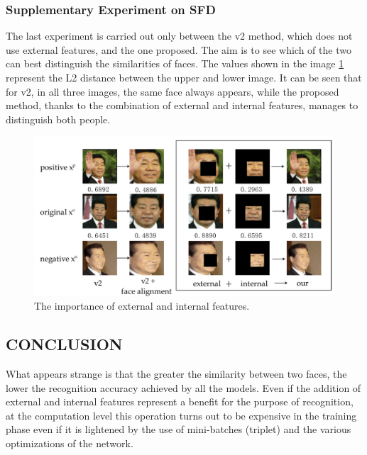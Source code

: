 \subsubsection{Supplementary Experiment on SFD}
The last experiment is carried out only between the v2 method, which does 
not use external features, and the one proposed. The aim is to see which of 
the two can best distinguish the similarities of faces. The values shown in the 
image \ref{fig:fei} represent the L2 distance between the upper and lower image. It can 
be seen that for v2, in all three images, the same face always appears, while 
the proposed method, thanks to the combination of external and internal 
features, manages to distinguish both people.
\begin{figure}[h!]
    \centering
    \includegraphics[width = 0.7\linewidth]{images/paper9/features.png}
    \centering
    \caption{The importance of external and internal features.}
    \label{fig:fei}
\end{figure}

\subsection{CONCLUSION}
What appears strange is that the greater the similarity between two faces, 
the lower the recognition accuracy achieved by all the models. Even if the 
addition of external and internal features represent a benefit for the purpose 
of recognition, at the computation level this operation turns out to be expensive 
in the training phase even if it is lightened by the use of mini-batches 
(triplet) and the various optimizations of the network.
